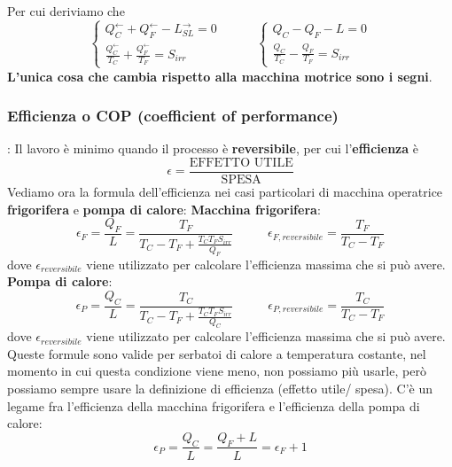 Per cui deriviamo che
\[
    \begin{cases}
        Q_C^\leftarrow  + Q_F^\leftarrow  - L_{SL}^\rightarrow  = 0\\
        \frac{Q_C^\leftarrow}{T_C} + \frac{Q_F^\leftarrow}{T_F} = S_{irr}
    \end{cases} \;\;\;\;\;\;\;\;\;\; \begin{cases}
        Q_C - Q_F - L = 0\\
        \frac{Q_C}{T_C} - \frac{Q_F}{T_F} = S_{irr}
    \end{cases}
\]
\textbf{L'unica cosa che cambia rispetto alla macchina motrice sono i segni}.\newline
\newline
\subsubsection{Efficienza o COP (coefficient of performance)}:\newline
Il lavoro è minimo quando il processo è \textbf{reversibile}, per cui l'\textbf{efficienza} è
\[
    \epsilon = \frac{\text{EFFETTO UTILE}}{\text{SPESA}}
\]
Vediamo ora la formula dell'efficienza nei casi particolari di macchina operatrice \textbf{frigorifera} e \textbf{pompa di calore}:\newline
\textbf{Macchina frigorifera}:
\[
    \epsilon_F = \frac{Q_F}{L} = \frac{T_F}{T_C - T_F + \frac{T_CT_FS_{irr}}{Q_F}} \;\;\;\;\;\;\;\;\;\; \epsilon_{F,reversibile} = \frac{T_F}{T_C-T_F}
\]
dove $\epsilon_{reversibile}$ viene utilizzato per calcolare l'efficienza massima che si può avere.\newline
\textbf{Pompa di calore}:
\[
    \epsilon_P = \frac{Q_C}{L} = \frac{T_C}{T_C - T_F + \frac{T_CT_FS_{irr}}{Q_C}} \;\;\;\;\;\;\;\;\;\; \epsilon_{P,reversibile} = \frac{T_C}{T_C-T_F}
\]
dove $\epsilon_{reversibile}$ viene utilizzato per calcolare l'efficienza massima che si può avere.\newline
\newline
Queste formule sono valide per serbatoi di calore a temperatura costante, nel momento in cui questa condizione viene meno, non possiamo più usarle, però possiamo sempre usare la definizione di efficienza (effetto utile/ spesa).
\newline
\newline
C'è un legame fra l'efficienza della macchina frigorifera e l'efficienza della pompa di calore:
\[
    \epsilon_P = \frac{Q_C}{L} = \frac{Q_F+L}{L} = \epsilon_F + 1
\]
